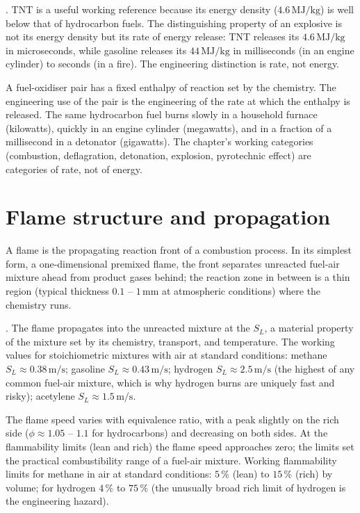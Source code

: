 . TNT is a useful working
reference because its energy density ($4.6\,\text{MJ}/\text{kg}$) is
well below that of hydrocarbon fuels. The distinguishing property of
an explosive is not its energy density but its rate of energy release:
TNT releases its $4.6\,\text{MJ}/\text{kg}$ in microseconds, while
gasoline releases its $44\,\text{MJ}/\text{kg}$ in milliseconds (in
an engine cylinder) to seconds (in a fire). The engineering
distinction is rate, not energy.

\begin{principle}
A fuel-oxidiser pair has a fixed enthalpy of reaction set by the
chemistry. The engineering use of the pair is the engineering of the
rate at which the enthalpy is released. The same hydrocarbon fuel
burns slowly in a household furnace (kilowatts), quickly in an engine
cylinder (megawatts), and in a fraction of a millisecond in a
detonator (gigawatts). The chapter's working categories (combustion,
deflagration, detonation, explosion, pyrotechnic effect) are
categories of rate, not of energy.
\end{principle}

\section{Flame structure and propagation}

A flame is the propagating reaction front of a combustion process.
In its simplest form, a one-dimensional premixed flame, the front
separates unreacted fuel-air mixture ahead from product gases behind;
the reaction zone in between is a thin region (typical thickness
$0.1$ -- $1\,\text{mm}$ at atmospheric conditions) where the chemistry
runs.

. The flame propagates into the
unreacted mixture at the  $S_L$, a
material property of the mixture set by its chemistry, transport, and
temperature. The working values for stoichiometric mixtures with air
at standard conditions: methane $S_L \approx 0.38\,\text{m}/\text{s}$;
gasoline $S_L \approx 0.43\,\text{m}/\text{s}$; hydrogen $S_L \approx
2.5\,\text{m}/\text{s}$ (the highest of any common fuel-air mixture,
which is why hydrogen burns are uniquely fast and risky); acetylene
$S_L \approx 1.5\,\text{m}/\text{s}$.

The flame speed varies with equivalence ratio, with a peak slightly
on the rich side ($\phi \approx 1.05$ -- $1.1$ for hydrocarbons) and
decreasing on both sides. At the flammability limits (lean and rich)
the flame speed approaches zero; the limits set the practical
combustibility range of a fuel-air mixture. Working flammability
limits for methane in air at standard conditions: $5\,\%$ (lean) to
$15\,\%$ (rich) by volume; for hydrogen $4\,\%$ to $75\,\%$ (the
unusually broad rich limit of hydrogen is the engineering hazard).

